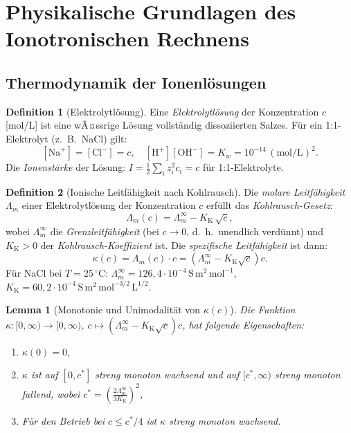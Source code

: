 ﻿\documentclass[a4paper,12pt]{article}
\theoremstyle{plain}
\newtheorem{lemma}{Lemma}
\theoremstyle{definition}
\newtheorem{definition}{Definition}
\theoremstyle{remark}
\begin{document}
\section{Physikalische Grundlagen des Ionotronischen Rechnens}

\subsection{Thermodynamik der Ionenl\"osungen}

\begin{definition}[Elektrolytl\"osung]
\label{def:elektrolyt}
Eine \emph{Elektrolytl\"osung} der Konzentration $c$ [mol/L] ist eine
wÃ¤ssrige L\"osung vollst\"andig dissoziierten Salzes.
F\"ur ein 1:1-Elektrolyt (z.~B.\ NaCl) gilt:
\[
[\mathrm{Na}^+] = [\mathrm{Cl}^-] = c,
\quad [\mathrm{H}^+][\mathrm{OH}^-] = K_w = 10^{-14}\,(\mathrm{mol/L})^2.
\]
Die \emph{Ionenst\"arke} der L\"osung:
$I = \frac{1}{2}\sum_i z_i^2 c_i = c$ f\"ur 1:1-Elektrolyte.
\end{definition}

\begin{definition}[Ionische Leitf\"ahigkeit nach Kohlrausch]
\label{def:leitfaehigkeit}
Die \emph{molare Leitf\"ahigkeit} $\Lambda_m$ einer Elektrolytl\"osung
der Konzentration $c$ erf\"ullt das \emph{Kohlrausch-Gesetz}:
\[
\Lambda_m(c) = \Lambda_m^\infty - K_{\mathrm{K}}\,\sqrt{c},
\]
wobei $\Lambda_m^\infty$ die \emph{Grenzleitf\"ahigkeit} (bei $c \to 0$,
d.~h.\ unendlich verd\"unnt) und $K_{\mathrm{K}} > 0$ der
\emph{Kohlrausch-Koeffizient} ist.
Die \emph{spezifische Leitf\"ahigkeit} ist dann:
\[
\kappa(c) = \Lambda_m(c) \cdot c = \left(\Lambda_m^\infty - K_{\mathrm{K}}\sqrt{c}\right) c.
\]
F\"ur NaCl bei $T = 25\,^\circ$C:
$\Lambda_m^\infty = 126{,}4 \cdot 10^{-4}\,\mathrm{S\,m^2\,mol^{-1}}$,
$K_{\mathrm{K}} = 60{,}2 \cdot 10^{-4}\,\mathrm{S\,m^2\,mol^{-3/2}\,L^{1/2}}$.
\end{definition}

\begin{lemma}[Monotonie und Unimodalit\"at von $\kappa(c)$]
\label{lem:kappa_mono}
Die Funktion $\kappa: [0, \infty) \to [0, \infty)$, $c \mapsto (\Lambda_m^\infty - K_{\mathrm{K}}\sqrt{c})c$,
hat folgende Eigenschaften:
\begin{enumerate}[label=(\roman*)]
    \item $\kappa(0) = 0$,
    \item $\kappa$ ist auf $[0, c^*]$ streng monoton wachsend und auf $[c^*, \infty)$ streng monoton fallend,
          wobei $c^* = \left(\frac{2\Lambda_m^\infty}{3K_{\mathrm{K}}}\right)^2$,
    \item F\"ur den Betrieb bei $c \leq c^*/4$ ist $\kappa$ streng monoton wachsend.
\end{enumerate}
\end{lemma}
\end{document}
